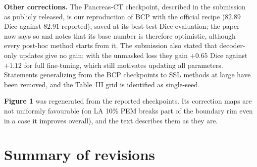 \documentclass[11pt,a4paper]{article}
\begin{document}
\textbf{Other corrections.} The Pancreas-CT checkpoint, described in the submission as publicly released, is our reproduction of BCP with the official recipe ($82.89$ Dice against $82.91$ reported), saved at its best-test-Dice evaluation; the paper now says so and notes that its base number is therefore optimistic, although every post-hoc method starts from it. The submission also stated that decoder-only updates give no gain; with the unmasked loss they gain $+0.65$ Dice against $+1.12$ for full fine-tuning, which still motivates updating all parameters. Statements generalizing from the BCP checkpoints to SSL methods at large have been removed, and the Table~III grid is identified as single-seed.

\textbf{Figure 1} was regenerated from the reported checkpoints. Its correction maps are not uniformly favourable (on LA 10\% PEM breaks part of the boundary rim even in a case it improves overall), and the text describes them as they are.

\section*{Summary of revisions}
\end{document}
